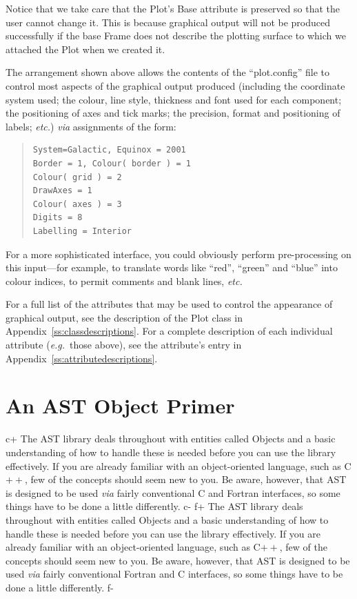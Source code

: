 \documentclass[twoside,11pt]{article}
\newcommand{\appref}[1]{Appendix~\ref{#1}}
\newcommand{\appref}[1]{\ref{#1}}
\begin{document}
Notice that we take care that the Plot's Base attribute is preserved
so that the user cannot change it. This is because graphical output
will not be produced successfully if the base Frame does not describe
the plotting surface to which we attached the Plot when we created it.

The arrangement shown above allows the contents of the ``plot.config''
file to control most aspects of the graphical output produced
(including the coordinate system used; the colour, line style,
thickness and font used for each component; the positioning of axes
and tick marks; the precision, format and positioning of labels;
{\em{etc.}}) {\em{via}} assignments of the form:

\begin{quote}
\small
\begin{verbatim}
System=Galactic, Equinox = 2001
Border = 1, Colour( border ) = 1
Colour( grid ) = 2
DrawAxes = 1
Colour( axes ) = 3
Digits = 8
Labelling = Interior
\end{verbatim}
\normalsize
\end{quote}

For a more sophisticated interface, you could obviously perform
pre-processing on this input---for example, to translate words like
``red'', ``green'' and ``blue'' into colour indices, to permit
comments and blank lines, {\em{etc.}}

For a full list of the attributes that may be used to control the
appearance of graphical output, see the description of the Plot class
in \appref{ss:classdescriptions}. For a complete description of each
individual attribute ({\em{e.g.}}\ those above), see the attribute's
entry in \appref{ss:attributedescriptions}.

\cleardoublepage
\section{\label{ss:primer}An AST Object Primer}

c+
The AST library deals throughout with entities called Objects and a
basic understanding of how to handle these is needed before you can
use the library effectively.  If you are already familiar with an
object-oriented language, such as C$++$, few of the concepts should
seem new to you.  Be aware, however, that AST is designed to be used
{\em{via}} fairly conventional C and Fortran interfaces, so some
things have to be done a little differently.
c-
f+
The AST library deals throughout with entities called Objects and a
basic understanding of how to handle these is needed before you can
use the library effectively.  If you are already familiar with an
object-oriented language, such as C$++$, few of the concepts should
seem new to you.  Be aware, however, that AST is designed to be used
{\em{via}} fairly conventional Fortran and C interfaces, so some
things have to be done a little differently.
f-
\end{document}
